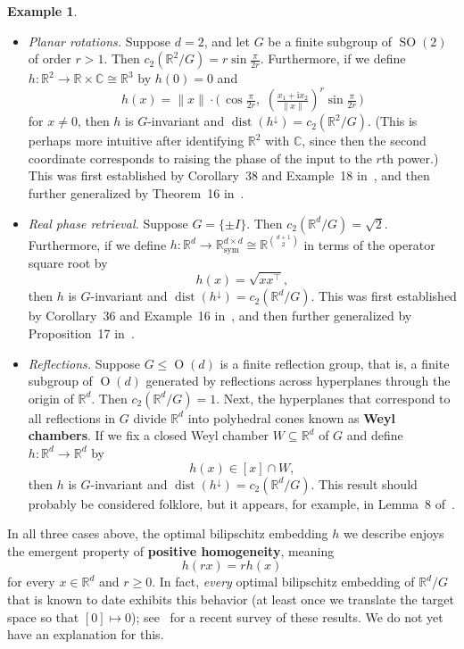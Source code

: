 \documentclass{article}
\theoremstyle{plain}
\theoremstyle{definition}
\newtheorem{example}[theorem]{Example}
\begin{document}
\begin{example}\
\label{ex.optimal coordinates}
\begin{itemize}
\item[(a)]
\textit{Planar rotations.}
Suppose $d=2$, and let $G$ be a finite subgroup of $\operatorname{SO}(2)$ of order $r>1$.
Then $c_2(\mathbb{R}^2/G)=r\sin\frac{\pi}{2r}$.
Furthermore, if we define $h\colon\mathbb{R}^2\to\mathbb{R}\times\mathbb{C}\cong\mathbb{R}^3$ by $h(0)=0$ and
\[
h(x)
=\|x\|\cdot\big(\,
\cos\tfrac{\pi}{2r},\,\,
(\tfrac{x_1+\mathrm{i}x_2}{\|x\|})^r \sin\tfrac{\pi}{2r}\,\big)
\]
for $x\neq0$, then $h$ is $G$-invariant and $\operatorname{dist}(h^\downarrow)=c_2(\mathbb{R}^2/G)$.
(This is perhaps more intuitive after identifying $\mathbb{R}^2$ with $\mathbb{C}$, since then the second coordinate corresponds to raising the phase of the input to the $r$th power.)
This was first established by Corollary~38 and Example~18 in~\cite{CahillIM:24}, and then further generalized by Theorem~16 in~\cite{Blum-SmitEtal:25}.
\item[(b)]
\textit{Real phase retrieval.}
Suppose $G=\{\pm I\}$. 
Then $c_2(\mathbb{R}^d/G)=\sqrt{2}$.
Furthermore, if we define $h\colon\mathbb{R}^d\to\mathbb{R}^{d\times d}_{\operatorname{sym}}\cong\mathbb{R}^{\binom{d+1}{2}}$ in terms of the operator square root by
\[
h(x)
=\sqrt{xx^\top},
\]
then $h$ is $G$-invariant and $\operatorname{dist}(h^\downarrow)=c_2(\mathbb{R}^d/G)$.
This was first established by Corollary~36 and Example~16 in~\cite{CahillIM:24}, and then further generalized by Proposition~17 in~\cite{Blum-SmitEtal:25}.
\item[(c)]
\textit{Reflections.}
Suppose $G\leq\operatorname{O}(d)$ is a finite reflection group, that is, a finite subgroup of $\operatorname{O}(d)$ generated by reflections across hyperplanes through the origin of $\mathbb{R}^d$.
Then $c_2(\mathbb{R}^d/G)=1$.
Next, the hyperplanes that correspond to all reflections in $G$ divide $\mathbb{R}^d$ into polyhedral cones known as \textbf{Weyl chambers}.
If we fix a closed Weyl chamber $W\subseteq\mathbb{R}^d$ of $G$ and define $h\colon\mathbb{R}^d\to\mathbb{R}^d$ by
\[
h(x)\in [x]\cap W,
\]
then $h$ is $G$-invariant and $\operatorname{dist}(h^\downarrow)=c_2(\mathbb{R}^d/G)$.
This result should probably be considered folklore, but it appears, for example, in Lemma~8 of~\cite{MixonP:23}.
\end{itemize}
\end{example}

In all three cases above, the optimal bilipschitz embedding $h$ we describe enjoys the emergent property of \textbf{positive homogeneity}, meaning
\[
h(rx)
=rh(x)
\]
for every $x\in\mathbb{R}^d$ and $r\geq0$.
In fact, \textit{every} optimal bilipschitz embedding of $\mathbb{R}^d/G$ that is known to date exhibits this behavior (at least once we translate the target space so that $[0]\mapsto 0$); see~\cite{Blum-SmitEtal:25} for a recent survey of these results.
We do not yet have an explanation for this.
\end{document}
